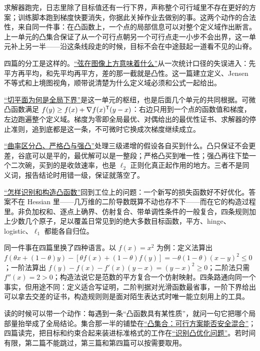 求解器跑完，日志里除了目标值还有一行下界，声称整个可行域里不存在更好的方案；训练脚本跑到梯度快要消失，你据此关掉作业去做别的事。这两个动作的合法性，来自同一件事：在凸函数上，一个点的局部信息可以对整个定义域作出断言。上一单元的凸集合保证了从一个可行点朝另一个可行点走一小步不会出界，这一单元补上另一半——沿这条线段走的时候，目标不会在中途鼓起一道看不见的山脊。

四篇的分工是这样的。\hyperref[sec:09-Convex-Optimization/03-Convex-Functions/01]{``弦在图像上方意味着什么''}从一次统计口径的失误进入：先平方再平均，和先平均再平方，差的那一截就是凸性。这一篇建立定义、Jensen 不等式和上境图视角，顺带说清楚为什么定义域必须和公式一起给出。

\hyperref[sec:09-Convex-Optimization/03-Convex-Functions/02]{``切平面为何是全局下界''}是这一单元的枢纽，也是后面几个单元的共同根据。可微凸函数满足 \(f(y)\ge f(x)+\nabla f(x)^{\mathsf{T}}(y-x)\)：右边只用到一个点的函数值和梯度，左边跑遍整个定义域。梯度为零即全局最优、对偶给出的最优性证书、求解器的停止准则，追到底都是这一条，不可微时它换成次梯度继续成立。

\hyperref[sec:09-Convex-Optimization/03-Convex-Functions/03]{``曲率区分凸、严格凸与强凸''}处理三级递增的假设各自买到什么。凸只保证不会更差，谷底可以是平的，最优解可以是一整段；严格凸买到唯一性；强凸再往下垫一个二次碗，买到的是收敛速率，也是 \(\ell_2\) 正则化真正起作用的地方。三者不是同义词，报告结论时用错一级，保证就落空了。

\hyperref[sec:09-Convex-Optimization/03-Convex-Functions/04]{``怎样识别和构造凸函数''}回到工位上的问题：一个新写的损失函数好不好优化。答案不在 Hessian 里——几万维的二阶导数既算不动也存不下——而在它的构造过程里。非负加权和、逐点上确界、仿射复合、带单调性条件的一般复合，四条规则加上少数几个原子，足以覆盖日常见到的绝大多数目标函数，平方、hinge、logistic、\(\ell_1\) 都能各自归位。

同一件事在四篇里换了四种语言。以 \(f(x)=x^2\) 为例：定义法算出 \(f(\theta x+(1-\theta)y)-[\theta f(x)+(1-\theta)f(y)]=-\theta(1-\theta)(x-y)^2\le0\)；一阶法算出 \(f(y)-f(x)-f'(x)(y-x)=(y-x)^2\ge0\)；二阶法只需 \(f''(x)=2>0\)；构造法说它是范数的平方复合一个仿射映射。四条路通向同一个事实，但用途不同：定义适合写证明，二阶判据对光滑函数最省事，一阶下界给出可以拿去交差的证书，构造规则则是面对陌生表达式时唯一能立刻用上的工具。

读的时候可以带一个动作：每遇到一条``凸函数具有某性质''，就问一句它把哪个局部量抬举成了全局结论。集合那一半的铺垫在\hyperref[ch:072]{``凸集合：可行方案能否安全混合''}；四篇读完，把目标和约束合起来装进标准格式的工作在\hyperref[ch:074]{``识别凸优化问题''}。若时间有限，第二篇不能跳过，第三篇和第四篇可以按需要取用。
